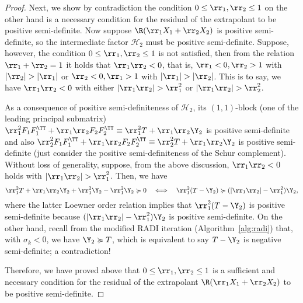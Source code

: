 \begin{proof}
Next, we show by contradiction the condition $0\le \rr_1,\rr_2 \le 1$ on the other hand is a necessary condition for the residual of the extrapolant to be positive semi-definite.
Now suppose $\R(\rr_1X_1 + \rr_2X_2)$ is positive semi-definite, so the intermediate factor $\mathscr{H}_2$ must be positive semi-definite. Suppose, however, the condition $0\le \rr_1,\rr_2 \le 1$ is not satisfied, then from the relation $\rr_1+\rr_2=1$ it holds that
$\rr_1\rr_2<0$, that is,
$\rr_1 <0, \rr_2>1$ with $|\rr_2|>|\rr_1|$
or $\rr_2 <0, \rr_1>1$ with $|\rr_1|>|\rr_2|$. This is to say,
we have $\rr_1\rr_2<0$ with either $|\rr_1\rr_2|>\rr_1^2$ or $|\rr_1\rr_2|>\rr_2^2$.

As a consequence of positive semi-definiteness of $\mathscr{H}_2$, its $(1,1)$-block (one of the leading principal submatrix)
$\rr_1^2F_1F_1^\TT+\rr_1\rr_2F_2F_2^\TT\equiv \rr_1^2T+\rr_1\rr_2\Y_2$ is positive semi-definite and also $\rr_2^2F_1F_1^\TT+\rr_1\rr_2F_2F_2^\TT\equiv\rr_2^2 T +\rr_1\rr_2\Y_2$ is positive semi-definite (just consider the positive semi-definiteness of the Schur complement).
Without loss of generality, suppose, from the above discussion,
$\rr_1\rr_2<0$ holds with $|\rr_1\rr_2|>\rr_1^2$. Then, we have
\begin{equation*}
	\rr_1^2T+\rr_1\rr_2\Y_2 + \rr_1^2\Y_2 - \rr_1^2\Y_2  \succcurlyeq 0 \quad \Longleftrightarrow \quad
	\rr_1^2(T - \Y_2 )  \succcurlyeq (|\rr_1\rr_2| - \rr_1^2)\Y_2,
\end{equation*}
where the latter Loewner order relation implies that
$\rr_1^2(T - \Y_2 )$ is positive semi-definite because
$ (|\rr_1\rr_2| - \rr_1^2)\Y_2$ is positive semi-definite.
On the other hand,
recall from the modified RADI iteration (Algorithm~\ref{alg:radi}) that, with $\sigma_k<0$, we have
$\Y_2 \succcurlyeq T$, which is equivalent to say $T-\Y_2$ is negative semi-definite; a contradiction!

Therefore, we have proved above that
$0\le \rr_1,\rr_2 \le 1$ is a sufficient and necessary condition for the residual of the extrapolant $\R(\rr_1X_1 + \rr_2X_2)$ to be positive semi-definite.
\end{proof}
